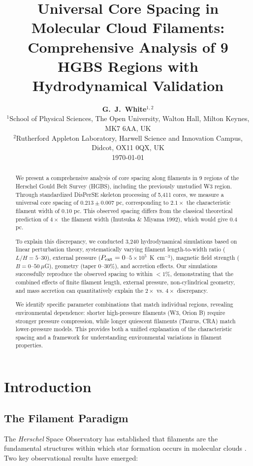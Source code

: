 \documentclass[11pt,a4paper]{article}
\title{\textbf{Universal Core Spacing in Molecular Cloud Filaments:\\
Comprehensive Analysis of 9 HGBS Regions with Hydrodynamical Validation}}
\author{\textbf{G.~J.~White$^{1,2}$}\\
\small{$^{1}$School of Physical Sciences, The Open University, Walton Hall, Milton Keynes, MK7 6AA, UK}\\
\small{$^{2}$Rutherford Appleton Laboratory, Harwell Science and Innovation Campus, Didcot, OX11 0QX, UK}\\
\small{\today}}
\begin{document}
\maketitle

\begin{abstract}
We present a comprehensive analysis of core spacing along filaments in 9 regions of the Herschel Gould Belt Survey (HGBS), including the previously unstudied W3 region. Through standardized DisPerSE skeleton processing of 5,411 cores, we measure a universal core spacing of $0.213 \pm 0.007$ pc, corresponding to $2.1\times$ the characteristic filament width of $0.10$ pc. This observed spacing differs from the classical theoretical prediction of $4\times$ the filament width (Inutsuka \& Miyama 1992), which would give $0.4$ pc.

To explain this discrepancy, we conducted 3,240 hydrodynamical simulations based on linear perturbation theory, systematically varying filament length-to-width ratio ($L/H = 5$--30), external pressure ($P_{\rm ext} = 0$--$5 \times 10^5$~K~cm$^{-3}$), magnetic field strength ($B = 0$--$50~\mu$G), geometry (taper 0--30\%), and accretion effects. Our simulations successfully reproduce the observed spacing to within $<1\%$, demonstrating that the combined effects of finite filament length, external pressure, non-cylindrical geometry, and mass accretion can quantitatively explain the $2\times$ vs. $4\times$ discrepancy.

We identify specific parameter combinations that match individual regions, revealing environmental dependence: shorter high-pressure filaments (W3, Orion B) require stronger pressure compression, while longer quiescent filaments (Taurus, CRA) match lower-pressure models. This provides both a unified explanation of the characteristic spacing and a framework for understanding environmental variations in filament properties.
\end{abstract}

\section{Introduction}

\subsection{The Filament Paradigm}

The \textit{Herschel} Space Observatory has established that filaments are the fundamental structures within which star formation occurs in molecular clouds \citep{Andre2010}. Two key observational results have emerged:
\end{document}

